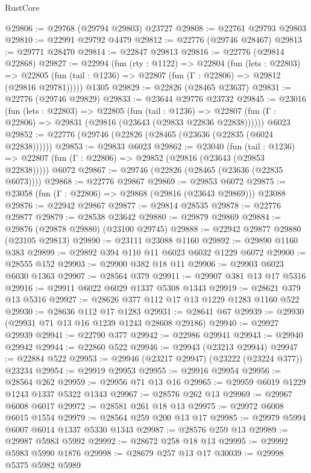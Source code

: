 \begin{lexlean}{RustCore}
\begin{coremodule}
@29806 := @29768 (@29794 @29803) @23727
@29808 := @22761 @29793 @29803
@29810 := @22991 @29792 @4479
@29812 := @22776 (@29746 @28467)
@29813 := @29771 @28470
@29814 := @22847 @29813
@29816 := @22776 (@29814 @22868)
@29827 := @22994
    (fun (rty : @1122) =>
    @22804
      (fun (lets : @22803) =>
      @22805 (fun (tail : @1236) => @22807 (fun (Γ : @22806) => @29812 (@29816 @29781)))))
    @1305
@29829 := @22826 (@28465 @23637)
@29831 := @22776 (@29746 @29829)
@29833 := @23644 @29776 @23732
@29845 := @23016
    (fun (lets : @22803) =>
    @22805
      (fun (tail : @1236) =>
      @22807 (fun (Γ : @22806) => @29831 (@29816 (@23643 (@29833 @22836 @22838))))))
    @6023
@29852 := @22776 (@29746 (@22826 (@28465 (@23636 (@22835 (@6024 @22838))))))
@29853 := @29833 @6023
@29862 := @23040
    (fun (tail : @1236) => @22807 (fun (Γ : @22806) => @29852 (@29816 (@23643 (@29853 @22838)))))
    @6072
@29867 := @29746 (@22826 (@28465 (@23636 (@22835 @6073))))
@29868 := @22776 @29867
@29869 := @29853 @6072
@29875 := @23058 (fun (Γ : @22806) => @29868 (@29816 (@23643 @29869))) @23088
@29876 := @22942 @29867
@29877 := @29814 @28535
@29878 := @22776 @29877
@29879 := @28538 @23642
@29880 := @29879 @29869
@29884 := @29876 (@29878 @29880) (@23100 @29745)
@29888 := @22942 @29877 @29880 (@23105 @29813)
@29890 := @23111 @23088 @1160
@29892 := @29890 @1160 @383
@29899 := @29892 @394 @110 @11 @6023 @6032 @1229 @6072
@29900 := @28555 @152
@29903 := @29900 @382 @18 @11
@29906 := @29903 @6023 @6030 @1363
@29907 := @28564 @379
@29911 := @29907 @381 @13 @17 @5316
@29916 := @29911 @6022 @6029 @1337 @5308 @1343
@29919 := @28621 @379 @13 @5316
@29927 := @28626 @377 @112 @17 @13 @1229 @1283 @1160 @522
@29930 := @28636 @112 @17 @1283
@29931 := @28641 @67
@29939 := @29930 (@29931 @71 @13 @16 @1239 @1243 @28608 @29186)
@29940 := @29927 @29939
@29941 := @22790 @377
@29942 := @22986 @29941
@29943 := @29940 @29942
@29944 := @22860 @522
@29946 := @29943 (@23213 @29944)
@29947 := @22884 @522
@29953 := @29946 (@23217 @29947) (@23222 (@23224 @377)) @23234
@29954 := @29919 @29953
@29955 := @29916 @29954
@29956 := @28564 @262
@29959 := @29956 @71 @13 @16
@29965 := @29959 @6019 @1229 @1243 @1337 @5322 @1343
@29967 := @28576 @262 @13
@29969 := @29967 @6008 @6017
@29972 := @28581 @261 @18 @13
@29975 := @29972 @6008 @6015 @1554
@29979 := @28564 @259 @200 @13 @17
@29985 := @29979 @5994 @6007 @6014 @1337 @5330 @1343
@29987 := @28576 @259 @13
@29989 := @29987 @5983 @5992
@29992 := @28672 @258 @18 @13
@29995 := @29992 @5983 @5990 @1876
@29998 := @28679 @257 @13 @17
@30039 := @29998
    @5375
    @5982
    @5989

\end{coremodule}
\end{lexlean}
